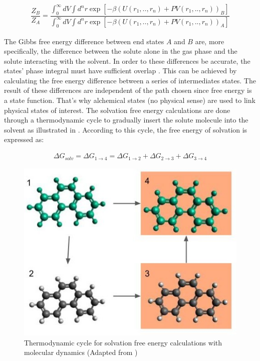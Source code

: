 \begin{equation}
\label{eq:partiso}
\begin{aligned}
\dfrac{Z_{B}}{Z_{A}} = \dfrac{\int_{0}^{\infty} dV \int d^{n}r \exp \left[ -\beta \left(U(r_{1},..,r_{n}) + PV(r_{1},..,r_{n}) \right)_{B} \right]}{\int_{0}^{\infty} dV \int d^{n}r \exp \left[ -\beta \left(U(r_{1},..,r_{n}) + PV(r_{1},..,r_{n}) \right)_{A} \right]}
\end{aligned}
\end{equation}

The Gibbs free energy difference between end states $A$ and $B$ are, more specifically, the difference between the solute alone in the gas phase and the solute interacting with the solvent. In order to these differences be accurate, the states' phase integral must have sufficient overlap  \cite{klimovich}. This can be achieved by calculating the free energy difference between a series of intermediates states. The result of these differences are independent of the path chosen since free energy is a state function. That's why alchemical states (no physical sense) are used to link physical states of interest. The solvation free energy calculations are done through a thermodynamic cycle to gradually insert the solute molecule into the solvent as illustrated in . According to this cycle, the free energy of solvation is expressed as:

\begin{equation}
\label{eq:freesolv}
\begin{aligned}
\Delta G_{solv} = \Delta G_{1 \rightarrow 4} = \Delta G_{1 \rightarrow 2} + \Delta G_{2 \rightarrow 3} + \Delta G_{3 \rightarrow 4}  
\end{aligned}
\end{equation}

\begin{figure}[th]
	\centering
	\includegraphics[scale=0.6]{Figures/cicclotermo.jpg}
	\caption{Thermodynamic cycle for solvation free energy calculations with molecular dynamics (Adapted from )}
	\label{thermcy}
\end{figure}

